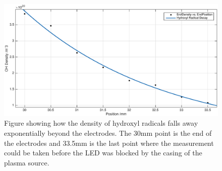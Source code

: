 \documentclass[11pt, oneside]{article}   	%
\begin{document}
\begin{figure}
	\centering
	\includegraphics[width=\textwidth]{Figures/OHdecay.eps}
	\caption{Figure showing how the density of hydroxyl radicals falls away exponentially beyond the electrodes. The 30mm point is the end of the electrodes and 33.5mm is the last point where the measurement could be taken before the LED was blocked by the casing of the plasma source.}
	\label{fig:OH decay}
\end{figure}
\end{document}
